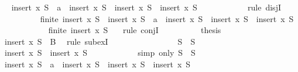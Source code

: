 \begin{isabellebody}
\ \isamarkupfalse%
\ {}{\isacharcolon}{\isachardoublequoteopen}insert\ x\ S\ {\isacharequal}\ {\isacharbraceleft}a{\isacharbraceright}\ {\isasymunion}\ {\isacharparenleft}insert\ x\ S{\isacharprime}{\isacharparenright}\ {\isasymor}\ insert\ x\ S\ {\isacharequal}\ insert\ x\ S{\isacharprime}{\isachardoublequoteclose}\isanewline
\ \ \ \ \ \ \ \ \ \ \isamarkupfalse%
\ {\isacharparenleft}rule\ disjI{}{\isacharparenright}\isanewline
\ \ \ \ \ \ \ \ \isamarkupfalse%
\ {\isachardoublequoteopen}finite\ {\isacharparenleft}insert\ x\ S{\isacharprime}{\isacharparenright}\ {\isasymand}\ {\isacharparenleft}insert\ x\ S\ {\isacharequal}\ {\isacharbraceleft}a{\isacharbraceright}\ {\isasymunion}\ {\isacharparenleft}insert\ x\ S{\isacharprime}{\isacharparenright}\ {\isasymor}\ insert\ x\ S\ {\isacharequal}\ insert\ x\ S{\isacharprime}{\isacharparenright}{\isachardoublequoteclose}\isanewline
\ \ \ \ \ \ \ \ \ \ \isamarkupfalse%
\ {\isacartoucheopen}finite\ {\isacharparenleft}insert\ x\ S{\isacharprime}{\isacharparenright}{\isacartoucheclose}\ {}\ \isamarkupfalse%
\ {\isacharparenleft}rule\ conjI{\isacharparenright}\isanewline
\ \ \ \ \ \ \ \ \isamarkupfalse%
\ {\isacharquery}thesis\isanewline
\ \ \ \ \ \ \ \ \ \ \isamarkupfalse%
\ {\isacartoucheopen}insert\ x\ S{\isacharprime}\ {\isasymsubseteq}\ B{\isacartoucheclose}\ \isamarkupfalse%
\ {\isacharparenleft}rule\ subexI{\isacharparenright}\isanewline
\ \ \ \ \ \ \isamarkupfalse%
\isanewline
\ \ \ \ \ \ \ \ \isamarkupfalse%
\ {\isachardoublequoteopen}S\ {\isacharequal}\ S{\isacharprime}{\isachardoublequoteclose}\isanewline
\ \ \ \ \ \ \ \ \isamarkupfalse%
\ {\isachardoublequoteopen}insert\ x\ S\ {\isacharequal}\ insert\ x\ S{\isacharprime}{\isachardoublequoteclose}\isanewline
\ \ \ \ \ \ \ \ \ \ \isamarkupfalse%
\ {\isacharparenleft}simp\ only{\isacharcolon}\ {\isacartoucheopen}S\ {\isacharequal}\ S{\isacharprime}{\isacartoucheclose}{\isacharparenright}\isanewline
\ \ \ \ \ \ \ \ \isamarkupfalse%
\ \isamarkupfalse%
\ {}{\isacharcolon}{\isachardoublequoteopen}insert\ x\ S\ {\isacharequal}\ {\isacharbraceleft}a{\isacharbraceright}\ {\isasymunion}\ {\isacharparenleft}insert\ x\ S{\isacharprime}{\isacharparenright}\ {\isasymor}\ insert\ x\ S\ {\isacharequal}\ insert\ x\ S{\isacharprime}{\isachardoublequoteclose}\isanewline
\ \ \ \ \ \ \ \ \ \ \isamarkupfalse%

\end{isabellebody}
